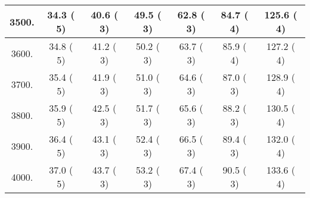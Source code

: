 \begin{tabular}{|c||c|c|c|c|c|c|}
\hline
 3500. &    34.3 (      5) &    40.6 (      3) &    49.5 (      3) &    62.8 (      3) &    84.7 (      4) &   125.6 (      4)\tabularnewline
\hline
 3600. &    34.8 (      5) &    41.2 (      3) &    50.2 (      3) &    63.7 (      3) &    85.9 (      4) &   127.2 (      4)\tabularnewline
\hline
 3700. &    35.4 (      5) &    41.9 (      3) &    51.0 (      3) &    64.6 (      3) &    87.0 (      3) &   128.9 (      4)\tabularnewline
\hline
 3800. &    35.9 (      5) &    42.5 (      3) &    51.7 (      3) &    65.6 (      3) &    88.2 (      3) &   130.5 (      4)\tabularnewline
\hline
 3900. &    36.4 (      5) &    43.1 (      3) &    52.4 (      3) &    66.5 (      3) &    89.4 (      3) &   132.0 (      4)\tabularnewline
\hline
 4000. &    37.0 (      5) &    43.7 (      3) &    53.2 (      3) &    67.4 (      3) &    90.5 (      3) &   133.6 (      4)\tabularnewline
\hline
\end{tabular}
